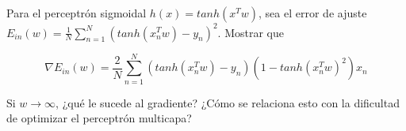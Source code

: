 \documentclass[11pt,leqno]{article}
\theoremstyle{definition}
\begin{document}
  \begin{solucion}
  \end{solucion}

  \begin{cuestion}
    Para el perceptrón sigmoidal $h(x) = tanh(x^Tw)$, sea el error de ajuste $E_{in}(w) = \frac{1}{N}\sum_{n=1}^N \left( tanh(x_n^Tw) - y_n \right)^2$. Mostrar que

    $$ \nabla E_{in}(w) = \frac{2}{N} \sum_{n=1}^N \left( tanh(x_n^Tw) - y_n \right) \left( 1 - tanh(x_n^Tw)^2 \right) x_n $$

    Si $w \rightarrow \infty$, ¿qué le sucede al gradiente? ¿Cómo se relaciona esto con la dificultad de optimizar el perceptrón multicapa?

  \end{cuestion}
\end{document}
